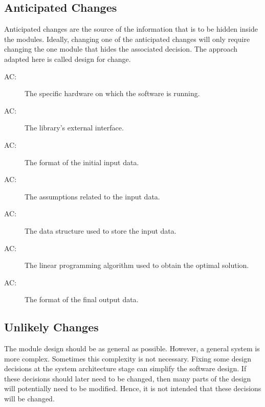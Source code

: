\documentclass[12pt, titlepage]{article}
\newcounter{acnum}
\newcommand{\actheacnum}{AC\theacnum}
\begin{document}
\subsection{Anticipated Changes} \label{SecAchange}

Anticipated changes are the source of the information that is to be hidden
inside the modules. Ideally, changing one of the anticipated changes will only
require changing the one module that hides the associated decision. The approach
adapted here is called design for
change.

\begin{description}
\item[ \actheacnum \label{acHardware}:] The specific
  hardware on which the software is running.
  
\item[ \actheacnum \label{acInterface}:] The library's 
external interface.
  
\item[ \actheacnum \label{acInput}:] The format of the
  initial input data.
  
\item[ \actheacnum \label{acInputAssumption}:] The 
assumptions related to the input data.

\item[ \actheacnum \label{acInputDataStructure}:] The 
data structure used to store the input data.

\item[ \actheacnum \label{acAlgorithm}:] The linear 
programming algorithm used to obtain the optimal solution.

\item[ \actheacnum \label{acOutput}:] The format of the 
final output data.
\end{description}

\subsection{Unlikely Changes} \label{SecUchange}

The module design should be as general as possible. However, a general system is
more complex. Sometimes this complexity is not necessary. Fixing some design
decisions at the system architecture stage can simplify the software design. If
these decisions should later need to be changed, then many parts of the design
will potentially need to be modified. Hence, it is not intended that these
decisions will be changed.
\end{document}
